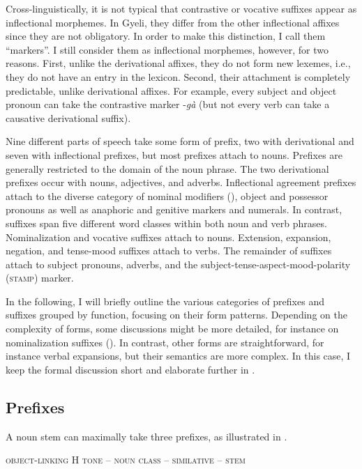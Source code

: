 Cross-linguistically, it is not typical that contrastive or vocative suffixes appear as inflectional morphemes. In Gyeli, they differ from the other inflectional affixes since they are not obligatory. In order to make this distinction, I  call them ``markers''. I still consider them as inflectional morphemes, however, for two reasons. First, unlike the derivational affixes, they do not form new lexemes, i.e., they do not have an entry in the lexicon. Second, their attachment is completely predictable, unlike derivational affixes. For example, every subject and object pronoun can take the contrastive marker -{\itshape gà} (but not every verb can take a causative derivational suffix). 

Nine different parts of speech take some form of prefix,  two with derivational and seven with inflectional prefixes, but most prefixes attach to nouns. Prefixes are generally restricted to the domain of the noun phrase. The two derivational prefixes occur with nouns, adjectives, and adverbs. Inflectional agreement prefixes attach to the diverse category of nominal modifiers (), object and possessor pronouns as well as anaphoric and genitive markers and numerals.  In contrast, suffixes span five different word classes within both noun and verb phrases. Nominalization and vocative  suffixes attach to nouns. Extension, expansion, negation, and tense-mood suffixes attach to verbs. The remainder of suffixes attach to subject pronouns, adverbs, and the subject-tense-aspect-mood-polarity (\textsc{stamp}) marker. 

In the following, I will briefly outline the various categories of prefixes and suffixes grouped by function, focusing on their form patterns. Depending on the complexity of forms, some discussions might be more detailed, for instance on nominalization suffixes (). In contrast, other forms are straightforward, for instance verbal expansions, but their semantics are more complex. In this case, I keep the formal discussion short and elaborate further in .  




\subsection{Prefixes}
\label{sec:Prefix}

A noun stem can maximally take three prefixes, as illustrated in .

\ea  \label{Prefix-extent} \textsc{object-linking H tone -- noun class -- similative -- stem}
\z


